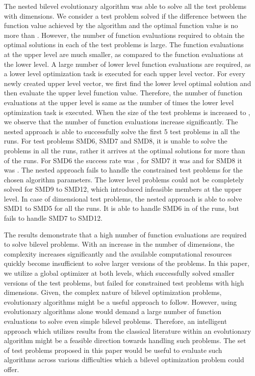 \documentclass[twoside]{article}
\begin{document}
The nested bilevel evolutionary algorithm was able to solve all the test problems with  dimensions. We consider a test problem solved if the difference between the function value achieved by the algorithm and the optimal function value is no more than . However, the number of function evaluations required to obtain the optimal solutions in each of the test problems is large. The function evaluations at the upper level are much smaller, as compared to the function evaluations at the lower level. A large number of lower level function evaluations are required, as a lower level optimization task is executed for each upper level vector. For every newly created upper level vector, we first find the lower level optimal solution and then evaluate the upper level function value. Therefore, the number of function evaluations at the upper level is same as the number of times the lower level optimization task is executed.
When the size of the test problems is increased to , we observe that the number of function evaluations increase significantly. The nested approach is able to successfully solve the first 5 test problems in all the runs. For test problems SMD6, SMD7 and SMD8, it is unable to solve the problems in all the runs, rather it arrives at the optimal solutions for more than  of the runs. For SMD6 the success rate was , for SMD7 it was  and for SMD8 it was . The nested approach fails to handle the constrained test problems for the chosen algorithm parameters. The lower level problems could not be completely solved for SMD9 to SMD12, which introduced infeasible members at the upper level. In case of  dimensional test problems, the nested approach is able to solve SMD1 to SMD5 for all the runs. It is able to handle SMD6 in  of the runs, but fails to handle SMD7 to SMD12.

The results demonstrate that a high number of function evaluations are required to solve bilevel problems. With an increase in the number of dimensions, the complexity increases significantly and the available computational resources quickly become insufficient to solve larger versions of the problems. In this paper, we utilize a global optimizer at both levels, which successfully solved smaller versions of the test problems, but failed for constrained test problems with high dimensions. Given, the complex nature of bilevel optimization problems, evolutionary algorithms might be a useful approach to follow. However, using evolutionary algorithms alone would demand a large number of function evaluations to solve even simple bilevel problems. Therefore, an intelligent approach which utilizes results from the classical literature within an evolutionary algorithm might be a feasible direction towards handling such problems. The set of test problems proposed in this paper would be useful to evaluate such algorithms across various difficulties which a bilevel optimization problem could offer.
\end{document}
